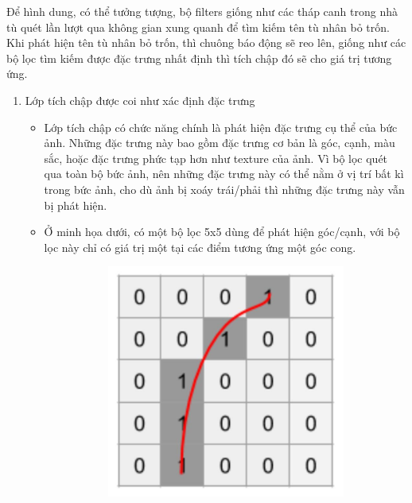 Để hình dung, có thể tưởng tượng, bộ filters giống như các tháp canh trong nhà tù quét
lần lượt qua không gian xung quanh để tìm kiếm tên tù nhân bỏ trốn.
Khi phát hiện tên tù nhân bỏ trốn, thì chuông báo động sẽ reo lên, giống như các bộ lọc
tìm kiếm được đặc trưng nhất định thì tích chập đó sẽ cho giá trị tương ứng.

\begin{enumerate}
    \item Lớp tích chập được coi như xác định đặc trưng
          \begin{itemize}
              \item Lớp tích chập có chức năng chính là phát hiện đặc trưng cụ thể của bức ảnh.
                    Những đặc trưng này bao gồm đặc trưng cơ bản là góc, cạnh, màu sắc, hoặc đặc trưng
                    phức tạp hơn như texture của ảnh. Vì bộ lọc quét qua toàn bộ bức ảnh, nên những
                    đặc trưng này có thể nằm ở vị trí bất kì trong bức ảnh, cho dù ảnh bị xoáy trái/phải
                    thì những đặc trưng này vẫn bị phát hiện.
              \item Ở minh họa dưới, có một bộ lọc 5x5 dùng để phát hiện góc/cạnh, với bộ lọc này
                    chỉ có giá trị một tại các điểm tương ứng một góc cong.
                    \begin{figure}
                        \begin{subfigure}{0.6\textwidth}
                            \begin{center}
                                \includegraphics[width=0.6\linewidth]{Chapters/items/chap2_3.jpg}
                            \end{center}
                            \label{fig: chap2_3}
                        \end{subfigure}

\end{figure}
\end{itemize}
\end{enumerate}

